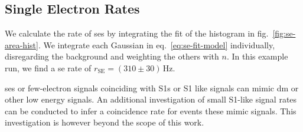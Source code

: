 
\FloatBarrier
\subsection{Single Electron Rates}
\label{ssec:rate}
\FloatBarrier


We calculate the rate of \glspl{se} by integrating the fit of the histogram in fig.~\ref{fig:se-area-hist}.
We integrate each Gaussian in eq.~\ref{eq:se-fit-model} individually, disregarding the background and weighting the others with $ n $.
In this example run, we find a \gls{se} rate of $ r_\mathrm{SE} = (310\pm30)\,\mathrm{Hz} $.

\glspl{se} or few-electron signals coinciding with S1s or S1 like signals can mimic \gls{dm} or other low energy signals.
An additional investigation of small S1-like signal rates can be conducted to infer a coincidence rate for events these mimic signals.
This investigation is however beyond the scope of this work.






